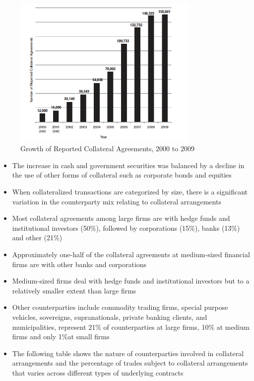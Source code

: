 \documentclass[11pt]{beamer}
\begin{document}
\begin{frame}
\begin{figure}
\includegraphics[width=0.8\textwidth]{13_2.png}
\caption{Growth of Reported Collateral Agreements, 2000 to 2009}
\end{figure}
\end{frame}

\begin{frame}
\begin{itemize}
\item The increase in cash and government securities was balanced by a decline in the use of other forms of collateral such as corporate bonds and equities
\item When collateralized transactions are categorized by size, there is a significant variation in the counterparty mix relating to collateral arrangements
\item Most collateral agreements among large firms are with hedge funds and institutional investors (50\%), followed by corporations (15\%), banks (13\%) and other (21\%)
\end{itemize}
\end{frame}

\begin{frame}
\begin{itemize}
\item Approximately one-half of the collateral agreements at medium-sized financial firms are with other banks and corporations
\item Medium-sized firms deal with hedge funds and institutional investors but to a relatively smaller extent than large firms
\item Other counterparties include commodity trading firms, special purpose vehicles, sovereigns, supranationals, private banking clients, and municipalities, represent 21\% of counterparties at large firms, 10\% at medium firms and only 1\%at small firms
\item The following table shows the nature of counterparties involved in collateral arrangements and the percentage of trades subject to collateral arrangements that varies across different types of underlying contracts
\end{itemize}
\end{frame}
\end{document}
